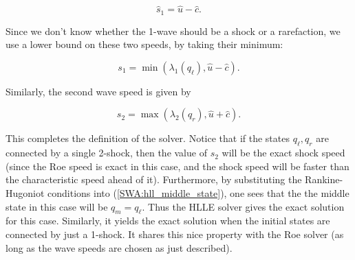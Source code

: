 \documentclass{SIAMbook2016}
\begin{document}
\[\hat{s}_1 = \hat{u} - \hat{c}.\]

Since we don't know whether the 1-wave should be a shock or a
rarefaction, we use a lower bound on these two speeds, by taking their
minimum:

\[s_1 = \min\left(\lambda_1(q_\ell), \hat{u}-\hat{c}\right).\]

Similarly, the second wave speed is given by

\[s_2 = \max\left(\lambda_2(q_r), \hat{u}+\hat{c}\right).\]

This completes the definition of the solver. Notice that if the states
\(q_\ell, q_r\) are connected by a single 2-shock, then the value of
\(s_2\) will be the exact shock speed (since the Roe speed is exact in
this case, and the shock speed will be faster than the characteristic
speed ahead of it). Furthermore, by substituting the Rankine-Hugoniot
conditions into (\ref{SWA:hll_middle_state}), one sees that the the
middle state in this case will be \(q_m = q_\ell\). Thus the HLLE solver
gives the exact solution for this case. Similarly, it yields the exact
solution when the initial states are connected by just a 1-shock. It
shares this nice property with the Roe solver (as long as the wave
speeds are chosen as just described).
\end{document}
